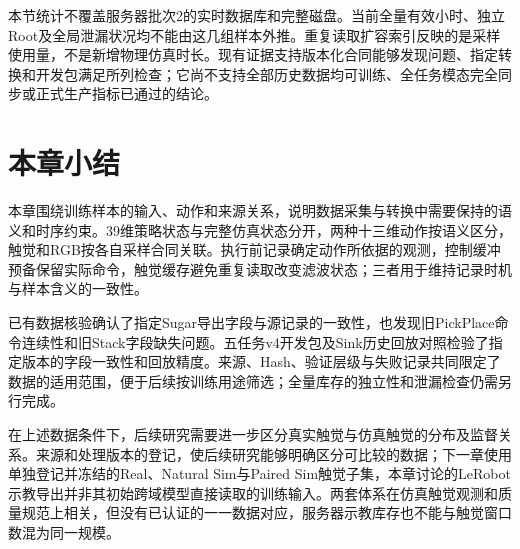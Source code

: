 本节统计不覆盖服务器批次2的实时数据库和完整磁盘。当前全量有效小时、独立Root及全局泄漏状况均不能由这几组样本外推。重复读取扩容索引反映的是采样使用量，不是新增物理仿真时长。现有证据支持版本化合同能够发现问题、指定转换和开发包满足所列检查；它尚不支持全部历史数据均可训练、全任务模态完全同步或正式生产指标已通过的结论。

\section{本章小结}
\label{sec:data_quality_summary}

本章围绕训练样本的输入、动作和来源关系，说明数据采集与转换中需要保持的语义和时序约束。39维策略状态与完整仿真状态分开，两种十三维动作按语义区分，触觉和RGB按各自采样合同关联。执行前记录确定动作所依据的观测，控制缓冲预备保留实际命令，触觉缓存避免重复读取改变滤波状态；三者用于维持记录时机与样本含义的一致性。

已有数据核验确认了指定Sugar导出字段与源记录的一致性，也发现旧PickPlace命令连续性和旧Stack字段缺失问题。五任务v4开发包及Sink历史回放对照检验了指定版本的字段一致性和回放精度。来源、Hash、验证层级与失败记录共同限定了数据的适用范围，便于后续按训练用途筛选；全量库存的独立性和泄漏检查仍需另行完成。

在上述数据条件下，后续研究需要进一步区分真实触觉与仿真触觉的分布及监督关系。来源和处理版本的登记，使后续研究能够明确区分可比较的数据；下一章使用单独登记并冻结的Real、Natural Sim与Paired Sim触觉子集，本章讨论的LeRobot示教导出并非其初始跨域模型直接读取的训练输入。两套体系在仿真触觉观测和质量规范上相关，但没有已认证的一一数据对应，服务器示教库存也不能与触觉窗口数混为同一规模。
